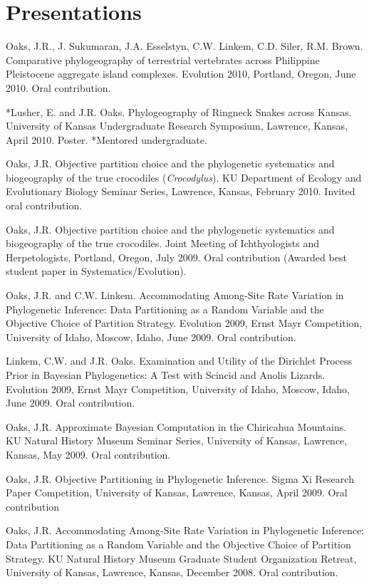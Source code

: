 \documentclass[10pt]{article}
\begin{document}
\section*{Presentations}
\hangindent=5mm
Oaks, J.R., J. Sukumaran, J.A. Esselstyn, C.W. Linkem, C.D. Siler, R.M. Brown.
Comparative phylogeography of terrestrial vertebrates across Philippine Pleistocene aggregate island complexes.
Evolution 2010, Portland, Oregon, June 2010.
Oral contribution.

\hangindent=5mm
*Lusher, E. and J.R. Oaks.
Phylogeography of Ringneck Snakes across Kansas.
University of Kansas Undergraduate Research Symposium, Lawrence, Kansas, April 2010.
Poster.
*Mentored undergraduate.

\hangindent=5mm
Oaks, J.R.
Objective partition choice and the phylogenetic systematics and biogeography of the true crocodiles (\emph{Crocodylus}).
KU Department of Ecology and Evolutionary Biology Seminar Series, Lawrence, Kansas, February 2010.
Invited oral contribution.

\hangindent=5mm
Oaks, J.R.
Objective partition choice and the phylogenetic systematics and biogeography of the true crocodiles.
Joint Meeting of Ichthyologists and Herpetologists, Portland, Oregon, July 2009.
Oral contribution (Awarded best student paper in Systematics/Evolution).

\hangindent=5mm
Oaks, J.R. and C.W. Linkem.
Accommodating Among-Site Rate Variation in Phylogenetic Inference: Data Partitioning as a Random Variable and the Objective Choice of Partition Strategy.
Evolution 2009, Ernst Mayr Competition, University of Idaho, Moscow, Idaho, June 2009.
Oral contribution.

\hangindent=5mm
Linkem, C.W. and J.R. Oaks.
Examination and Utility of the Dirichlet Process Prior in Bayesian Phylogenetics: A Test with Scincid and Anolis Lizards.
Evolution 2009, Ernst Mayr Competition, University of Idaho, Moscow, Idaho, June 2009.
Oral contribution.

\hangindent=5mm
Oaks, J.R.
Approximate Bayesian Computation in the Chiricahua Mountains.
KU Natural History Museum Seminar Series, University of Kansas, Lawrence, Kansas, May 2009.
Oral contribution.

\hangindent=5mm
Oaks, J.R.
Objective Partitioning in Phylogenetic Inference.
Sigma Xi Research Paper Competition, University of Kansas, Lawrence, Kansas, April 2009.
Oral contribution

\hangindent=5mm
Oaks, J.R.
Accommodating Among-Site Rate Variation in Phylogenetic Inference: Data Partitioning as a Random Variable and the Objective Choice of Partition Strategy.
KU Natural History Museum Graduate Student Organization Retreat, University of Kansas, Lawrence, Kansas, December 2008.
Oral contribution.
\end{document}
